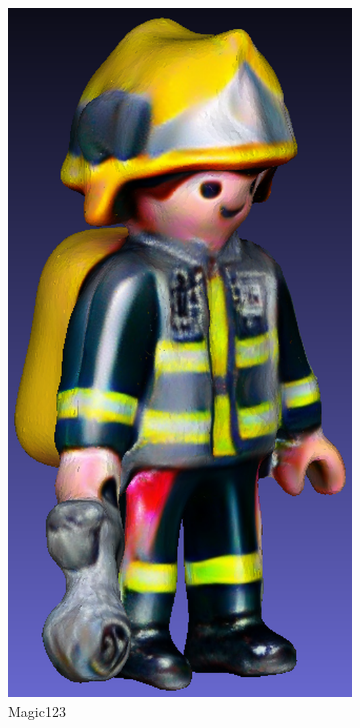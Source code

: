 \begin{figure}[ht]
\begin{subfigure}[b]{0.192\textwidth}
        \includegraphics[width=\textwidth]{etc/a high quality rendering of a playmobil firefighter/magic123/magic123_playmobil_result_resize.png}
        \caption{Magic123}
    \end{subfigure}
    \begin{subfigure}[b]{0.181\textwidth}

\end{subfigure}
\end{figure}
